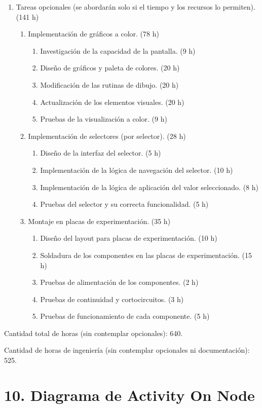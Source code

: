 \documentclass[
11pt, %
]{charter}
\begin{document}
\begin{enumerate}
	\item	Tareas opcionales (se abordarán solo si el tiempo y los recursos lo permiten). (141 h)
	\begin{enumerate}	
	\item	Implementación de gráficos a color. (78 h)
	\begin{enumerate}	
	\item	Investigación de la capacidad de la pantalla. (9 h)
	\item	Diseño de gráficos y paleta de colores. (20 h)
	\item	Modificación de las rutinas de dibujo. (20 h)
	\item	Actualización de los elementos visuales. (20 h)
	\item	Pruebas de la visualización a color. (9 h)
	\end{enumerate}	
	\item	Implementación de selectores (por selector). (28 h)
	\begin{enumerate}	
	\item	Diseño de la interfaz del selector. (5 h)
	\item	Implementación de la lógica de navegación del selector. (10 h)
	\item	Implementación de la lógica de aplicación del valor seleccionado. (8 h)
	\item	Pruebas del selector y su correcta funcionalidad. (5 h)
	\end{enumerate}	
	\item	Montaje en placas de experimentación. (35 h)
	\begin{enumerate}	
	\item	Diseño del layout para placas de experimentación. (10 h)
	\item	Soldadura de los componentes en las placas de experimentación. (15 h)
	\item	Pruebas de alimentación de los componentes. (2 h)
	\item	Pruebas de continuidad y cortocircuitos. (3 h)
	\item	Pruebas de funcionamiento de cada componente. (5 h)
	\end{enumerate}	
	\end{enumerate}	
	\end{enumerate}	
	Cantidad total de horas (sin contemplar opcionales): 640.	
		
	Cantidad de horas de ingeniería (sin contemplar opcionales ni documentación): 525.	

\section{10. Diagrama de Activity On Node}
\label{sec:AoN}
\end{document}
